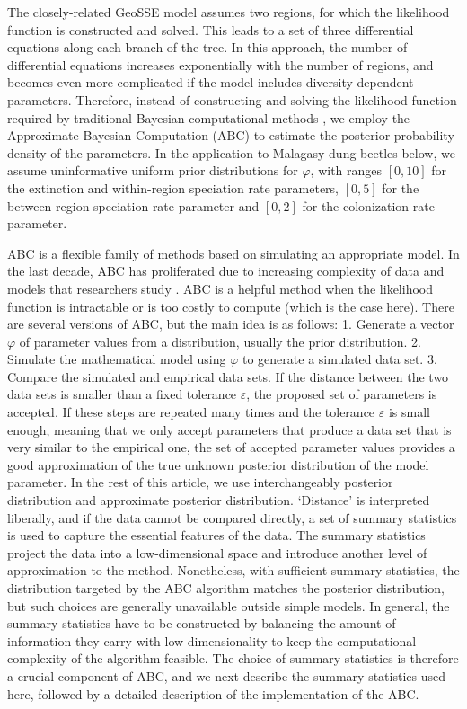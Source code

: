 The closely-related GeoSSE model \citep{Goldberg2011} assumes two regions, for which the likelihood function is constructed and solved. 
This leads to a set of three differential equations along each branch of the tree. 
In this approach, the number of differential equations increases exponentially with the number of regions, and becomes even more complicated if the model includes diversity-dependent parameters. 
Therefore, instead of constructing and solving the likelihood function required by traditional Bayesian computational methods \citep{Robert2013}, we employ the Approximate Bayesian Computation (ABC) to estimate the posterior probability density of the parameters. 
In the application to Malagasy dung beetles below, we assume uninformative uniform prior distributions for $\varphi$, with ranges $[0,10]$ for the extinction and within-region speciation rate parameters, $[0,5]$ for the between-region speciation rate parameter and $[0,2]$ for the colonization rate parameter. 

ABC is a flexible family of methods based on simulating an appropriate model. 
In the last decade, ABC has proliferated due to increasing complexity of data and models that researchers study \citep{Toni2009, Beaumont2010, Sunnaker2013}. 
ABC is a helpful method when the likelihood function is intractable or is too costly to compute (which is the case here). 
There are several versions of ABC, but the main idea is as follows: 1. Generate a vector $\varphi$ of parameter values from a distribution, usually the prior distribution. 
2. Simulate the mathematical model using $\varphi$ to generate a simulated data set.
3. Compare the simulated and empirical data sets. 
If the distance between the two data sets is smaller than a fixed tolerance $\varepsilon$, the proposed set of parameters is accepted. 
If these steps are repeated many times and the tolerance $\varepsilon$ is small enough, meaning that we only accept parameters that produce a data set that is very similar to the empirical one, the set of accepted parameter values provides a good approximation of the true unknown posterior distribution of the model parameter. 
In the rest of this article, we use interchangeably posterior distribution and approximate posterior distribution.  
‘Distance’ is interpreted liberally, and if the data cannot be compared directly, a set of summary statistics is used to capture the essential features of the data. 
The summary statistics project the data into a low-dimensional space and introduce another level of approximation to the method. 
Nonetheless, with sufficient summary statistics, the distribution targeted by the ABC algorithm matches the posterior distribution, but such choices are generally unavailable outside simple models. 
In general, the summary statistics have to be constructed by balancing the amount of information they carry with low dimensionality to keep the computational complexity of the algorithm feasible. 
The choice of summary statistics is therefore a crucial component of ABC, and we next describe the summary statistics used here, followed by a detailed description of the implementation of the ABC.

